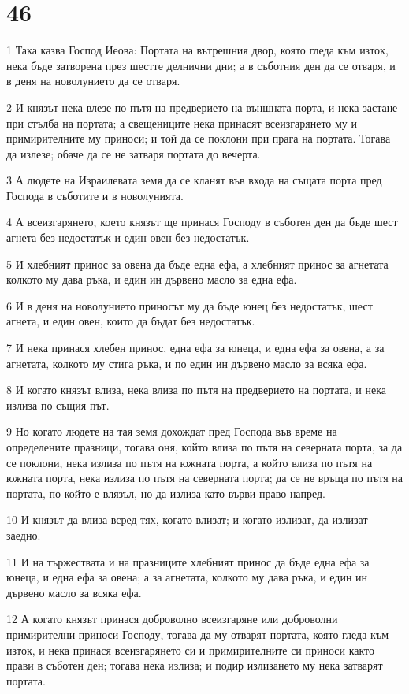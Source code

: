 \chapter{46}

\par 1 Така казва Господ Иеова: Портата на вътрешния двор, която гледа към изток, нека бъде затворена през шестте делнични дни; а в съботния ден да се отваря, и в деня на новолунието да се отваря.
\par 2 И князът нека влезе по пътя на предверието на външната порта, и нека застане при стълба на портата; а свещениците нека принасят всеизгарянето му и примирителните му приноси; и той да се поклони при прага на портата. Тогава да излезе; обаче да се не затваря портата до вечерта.
\par 3 А людете на Израилевата земя да се кланят във входа на същата порта пред Господа в съботите и в новолунията.
\par 4 А всеизгарянето, което князът ще принася Господу в съботен ден да бъде шест агнета без недостатък и един овен без недостатък.
\par 5 И хлебният принос за овена да бъде една ефа, а хлебният принос за агнетата колкото му дава ръка, и един ин дървено масло за една ефа.
\par 6 И в деня на новолунието приносът му да бъде юнец без недостатък, шест агнета, и един овен, които да бъдат без недостатък.
\par 7 И нека принася хлебен принос, една ефа за юнеца, и една ефа за овена, а за агнетата, колкото му стига ръка, и по един ин дървено масло за всяка ефа.
\par 8 И когато князът влиза, нека влиза по пътя на предверието на портата, и нека излиза по същия път.
\par 9 Но когато людете на тая земя дохождат пред Господа във време на определените празници, тогава оня, който влиза по пътя на северната порта, за да се поклони, нека излиза по пътя на южната порта, а който влиза по пътя на южната порта, нека излиза по пътя на северната порта; да се не връща по пътя на портата, по който е влязъл, но да излиза като върви право напред.
\par 10 И князът да влиза всред тях, когато влизат; и когато излизат, да излизат заедно.
\par 11 И на тържествата и на празниците хлебният принос да бъде една ефа за юнеца, и една ефа за овена; а за агнетата, колкото му дава ръка, и един ин дървено масло за всяка ефа.
\par 12 А когато князът принася доброволно всеизгаряне или доброволни примирителни приноси Господу, тогава да му отварят портата, която гледа към изток, и нека принася всеизгарянето си и примирителните си приноси както прави в съботен ден; тогава нека излиза; и подир излизането му нека затварят портата.
